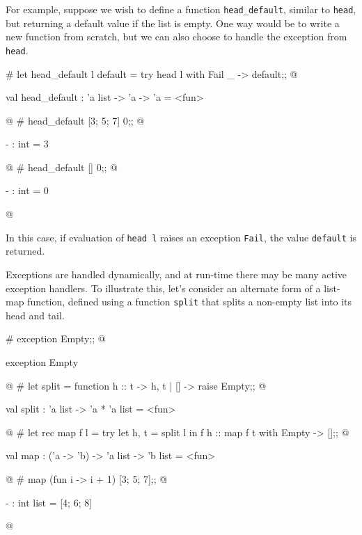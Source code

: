 For example, suppose we wish to define a function \hbox{\lstinline/head_default/}, similar
to \hbox{\lstinline/head/}, but returning a default value if the list is empty.  One way would be to write
a new function from scratch, but we can also choose to handle the exception from \hbox{\lstinline/head/}.

\begin{ocaml}
# let head_default l default =
     try head l with
        Fail _ -> default;;
@
\begin{topoutput}
val head_default : 'a list -> 'a -> 'a = <fun>
\end{topoutput}
@
# head_default [3; 5; 7] 0;;
@
\begin{topoutput}
- : int = 3
\end{topoutput}
@
# head_default [] 0;;
@
\begin{topoutput}
- : int = 0
\end{topoutput}
@
\end{ocaml}
%
In this case, if evaluation of
\hbox{\lstinline/head l/} raises an exception \hbox{\lstinline/Fail/}, the value
\hbox{\lstinline/default/} is returned.


Exceptions are handled dynamically, and at run-time there may be many
active exception handlers.  To illustrate this, let's consider an
alternate form of a list-map function, defined using a function
\hbox{\lstinline/split/} that splits a non-empty list into its head and tail.

\begin{ocaml}
# exception Empty;;
@
\begin{topoutput}
exception Empty
\end{topoutput}
@
# let split = function
     h :: t -> h, t
   | [] -> raise Empty;;
@
\begin{topoutput}
val split : 'a list -> 'a * 'a list = <fun>
\end{topoutput}
@
# let rec map f l =
     try
        let h, t = split l in
           f h :: map f t
     with
        Empty -> [];;
@
\begin{topoutput}
val map : ('a -> 'b) -> 'a list -> 'b list = <fun>
\end{topoutput}
@
# map (fun i -> i + 1) [3; 5; 7];;
@
\begin{topoutput}
- : int list = [4; 6; 8]
\end{topoutput}
@
\end{ocaml}


